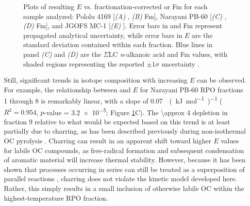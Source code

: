 \begin{figure}[p]
	\caption[RPO $E$ vs. isotope plots for all fractions in all samples]{Plots of resulting $E$ vs. fractionation-corrected  or Fm for each sample analyzed: Pololu 4169 [\textit{(A)} , \textit{(B)} Fm], Narayani PB-60 [\textit{(C)} , \textit{(D)} Fm], and JGOFS MC-1 [\textit{(E)} ]. Error bars in  and Fm represent propagated analytical uncertainty, while error bars in $E$ are the standard deviation contained within each fraction. Blue lines in panel \textit{(C)} and \textit{(D)} are the $\Sigma$LC \textit{n}-alkanoic acid  and Fm values, with shaded regions representing the reported $\pm 1 \sigma$ uncertainty \citep{Galy:2011hk,Galy:2011ix}.}
	\label{Ch3Fig:9} 
\end{figure}

Still, significant trends in isotope composition with increasing $E$ can be observed. For example, the relationship between  and $E$ for Narayani PB-60 RPO fractions 1 through 8 is remarkably linear, with a slope of \SI{0.07}{\permil.(kJ.mol^{-1})^{-1}} ($R^{2} = 0.954$, $p$-value = \num{3.2e-5}; Figure \ref{Ch3Fig:9}C). The \SI{\approx 4}{\permil}  depletion in fraction 9 relative to what would be expected based on this trend is at least partially due to charring, as has been described previously during non-isothermal OC pyrolysis \citep{Williams:2014bq}. Charring can result in an apparent shift toward higher $E$ values for labile OC compounds, as free-radical formation and subsequent condensation of aromatic material will increase thermal stability. However, because it has been shown that processes occurring in series can still be treated as a superposition of parallel reactions \citep{Forney:2014ws}, charring does not violate the kinetic model developed here. Rather, this simply results in a small inclusion of otherwise labile OC within the highest-temperature RPO fraction.

